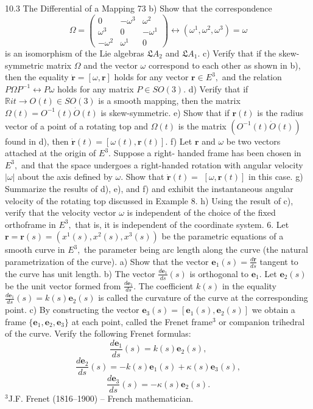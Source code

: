10.3 The Differential of a Mapping 73
b) Show that the correspondence
$$
\Omega = \begin{pmatrix} 0 & -\omega^3 & \omega^2 \\ \omega^3 & 0 & -\omega^1 \\ -\omega^2 & \omega^1 & 0 \end{pmatrix} \leftrightarrow (\omega^1, \omega^2, \omega^3) = \omega
$$
is an isomorphism of the Lie algebras $\mathfrak{L}A_2$ and $\mathfrak{L}A_1.$
c) Verify that if the skew-symmetric matrix $\Omega$ and the vector $\omega$ correspond to
each other as shown in b), then the equality $\dot{\mathbf{r}} = [\omega, \mathbf{r}]$ holds for any vector $\mathbf{r} \in E^3,$
and the relation $P\Omega P^{-1} \leftrightarrow P\omega$ holds for any matrix $P \in SO(3).$
d) Verify that if $\mathbb{R} 
i t \rightarrow O(t) \in SO(3)$ is a smooth mapping, then the matrix
$\Omega(t) = O^{-1}(t)\dot{O}(t)$ is skew-symmetric.
e) Show that if $\mathbf{r}(t)$ is the radius vector of a point of a rotating top and $\Omega(t)$ is
the matrix $(O^{-1}(t)\dot{O}(t))$ found in d), then $\dot{\mathbf{r}}(t) = [\omega(t),\mathbf{r}(t)].$
f) Let $\mathbf{r}$ and $\omega$ be two vectors attached at the origin of $E^3.$ Suppose a right-
handed frame has been chosen in $E^3,$ and that the space undergoes a right-handed
rotation with angular velocity $|\omega|$ about the axis defined by $\omega.$ Show that $\dot{\mathbf{r}}(t) =$
$[\omega, \mathbf{r}(t)]$ in this case.
g) Summarize the results of d), e), and f) and exhibit the instantaneous angular
velocity of the rotating top discussed in Example 8.
h) Using the result of c), verify that the velocity vector $\omega$ is independent of the
choice of the fixed orthoframe in $E^3,$ that is, it is independent of the coordinate
system.
6. Let $\mathbf{r} = \mathbf{r}(s) = (x^1(s), x^2(s), x^3(s))$ be the parametric equations of a smooth
curve in $E^3,$ the parameter being arc length along the curve (the natural parametrization of the curve).
a) Show that the vector $\mathbf{e}_1(s) = \frac{d\mathbf{r}}{ds}$ tangent to the curve has unit length.
b) The vector $\frac{d\mathbf{e}_1}{ds}(s)$ is orthogonal to $\mathbf{e}_1.$ Let $\mathbf{e}_2(s)$ be the unit vector
formed from $\frac{d\mathbf{e}_1}{ds}.$ The coefficient $k(s)$ in the equality $\frac{d\mathbf{e}_1}{ds}(s) = k(s)\mathbf{e}_2(s)$ is called
the curvature of the curve at the corresponding point.
c) By constructing the vector $\mathbf{e}_3 (s) = [\mathbf{e}_1 (s), \mathbf{e}_2(s)]$ we obtain a frame $\{\mathbf{e}_1, \mathbf{e}_2, \mathbf{e}_3\}$
at each point, called the Frenet frame$^3$ or companion trihedral of the curve. Verify
the following Frenet formulas:
$$
\frac{d\mathbf{e}_1}{ds}(s) = k(s)\mathbf{e}_2(s),
$$
$$
\frac{d\mathbf{e}_2}{ds}(s) = -k(s)\mathbf{e}_1(s) + \kappa(s)\mathbf{e}_3(s),
$$
$$
\frac{d\mathbf{e}_3}{ds}(s) = -\kappa(s)\mathbf{e}_2(s).
$$
$^3$J.F. Frenet (1816–1900) – French mathematician.